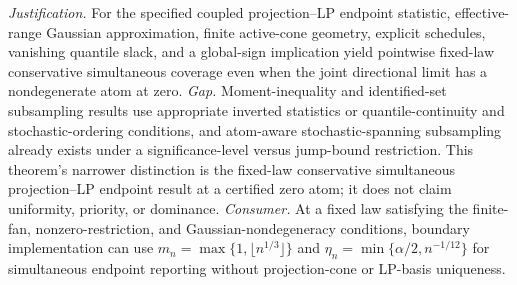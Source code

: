 \documentclass{article}
\begin{document}
\par\smallskip\noindent \textit{Justification.} For the specified coupled projection--LP endpoint statistic, effective-range Gaussian approximation, finite active-cone geometry, explicit schedules, vanishing quantile slack, and a global-sign implication yield pointwise fixed-law conservative simultaneous coverage even when the joint directional limit has a nondegenerate atom at zero. \textit{Gap.} Moment-inequality and identified-set subsampling results use appropriate inverted statistics or quantile-continuity and stochastic-ordering conditions, and atom-aware stochastic-spanning subsampling already exists under a significance-level versus jump-bound restriction. This theorem's narrower distinction is the fixed-law conservative simultaneous projection--LP endpoint result at a certified zero atom; it does not claim uniformity, priority, or dominance. \textit{Consumer.} At a fixed law satisfying the finite-fan, nonzero-restriction, and Gaussian-nondegeneracy conditions, boundary implementation can use \(m_n=\max\{1,\lfloor n^{1/3}\rfloor\}\) and \(\eta_n=\min\{\alpha/2,n^{-1/12}\}\) for simultaneous endpoint reporting without projection-cone or LP-basis uniqueness.
\end{document}
